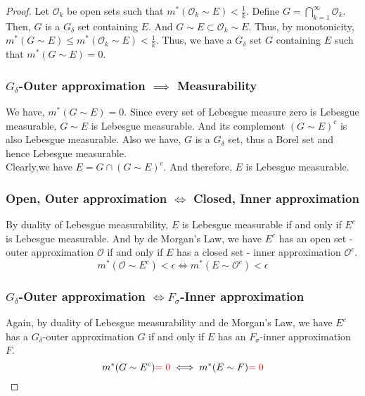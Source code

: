 \begin{proof}
	Let $\mathcal{O}_k$ be open sets such that $m^\ast(\mathcal{O}_k \sim E) < \frac{1}{k}$.
	Define $\displaystyle G = \bigcap_{k=1}^\infty \mathcal{O}_k$.
	Then, $G$ is a $G_\delta$ set containing $E$.
	And $G \sim E \subset \mathcal{O}_k \sim E$.
	Thus, by monotonicity, $m^\ast(G \sim E) \le m^\ast(\mathcal{O}_k \sim E) < \frac{1}{k}$.
	Thus, we have a $G_\delta$ set $G$ containing $E$ such that $m^\ast(G \sim E) = 0$.

\subsubsection*{$G_\delta$-Outer approximation $\implies$ Measurability}
	We have, $m^\ast(G \sim  E) = 0$.
	Since every set of Lebesgue measure zero is Lebesgue measurable, $G \sim E$ is Lebesgue measurable.
	And its complement $(G \sim E)^c$ is also Lebesgue measurable.
	Also we have, $G$ is a $G_\delta$ set, thus a Borel set and hence Lebesgue measurable.\\

	Clearly,we have $E = G \cap (G \sim E)^c$.
	And therefore, $E$ is Lebesgue measurable.

\subsubsection*{Open, Outer approximation $\iff$ Closed, Inner approximation}
	By duality of Lebesgue measurability, $E$ is Lebesgue measurable if and only if $E^c$ is Lebesgue measurable.
	And by de Morgan's Law, we have $E^c$ has an open set - outer approximation $\mathcal{O}$ if and only if $E$ has a closed set - inner approximation $\mathcal{O}^c$.
	$$ m^\ast(\mathcal{O} \sim E^c) < \epsilon \iff m^\ast(E \sim \mathcal{O}^c) < \epsilon $$

\subsubsection*{$G_\delta$-Outer approximation $\iff F_\sigma$-Inner approximation}
	Again, by duality of Lebesgue measurability and de Morgan's Law, we have $E^c$ has a $G_\delta$-outer approximation $G$ if and only if $E$ has an $F_\sigma$-inner approximation $F$.
	$$ m^\ast(G \sim E^c) {\color{red}= 0} \iff m^\ast(E \sim F){\color{red} = 0} $$
\end{proof}

